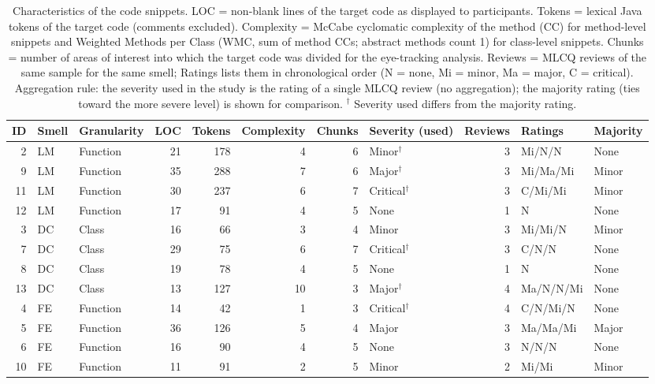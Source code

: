 \begin{table}[ht]
\centering
\caption{Characteristics of the code snippets. LOC = non-blank lines of the target code as displayed to
participants. Tokens = lexical Java tokens of the target code (comments excluded). Complexity = McCabe cyclomatic complexity of the method (CC) for method-level
snippets and Weighted Methods per Class (WMC, sum of method CCs; abstract methods count 1) for class-level
snippets. Chunks = number of areas of interest into which the target code was divided for the eye-tracking analysis.
Reviews = MLCQ reviews of the same sample for the same smell; Ratings lists them in chronological order
(N = none, Mi = minor, Ma = major, C = critical). Aggregation rule: the severity used in the study is the rating
of a single MLCQ review (no aggregation); the majority rating (ties toward the more severe level) is shown for
comparison. $^{\dagger}$ Severity used differs from the majority rating.}
\label{tab:snippet_characteristics}
\begin{tabular}{rllrrrrlrll}
\toprule
ID & Smell & Granularity & LOC & Tokens & Complexity & Chunks & Severity (used) & Reviews & Ratings & Majority \\
\midrule
2 & LM & Function & 21 & 178 & 4 & 6 & Minor$^{\dagger}$ & 3 & Mi/N/N & None \\
9 & LM & Function & 35 & 288 & 7 & 6 & Major$^{\dagger}$ & 3 & Mi/Ma/Mi & Minor \\
11 & LM & Function & 30 & 237 & 6 & 7 & Critical$^{\dagger}$ & 3 & C/Mi/Mi & Minor \\
12 & LM & Function & 17 & 91 & 4 & 5 & None & 1 & N & None \\
\midrule
3 & DC & Class & 16 & 66 & 3 & 4 & Minor & 3 & Mi/Mi/N & Minor \\
7 & DC & Class & 29 & 75 & 6 & 7 & Critical$^{\dagger}$ & 3 & C/N/N & None \\
8 & DC & Class & 19 & 78 & 4 & 5 & None & 1 & N & None \\
13 & DC & Class & 13 & 127 & 10 & 3 & Major$^{\dagger}$ & 4 & Ma/N/N/Mi & None \\
\midrule
4 & FE & Function & 14 & 42 & 1 & 3 & Critical$^{\dagger}$ & 4 & C/N/Mi/N & None \\
5 & FE & Function & 36 & 126 & 5 & 4 & Major & 3 & Ma/Ma/Mi & Major \\
6 & FE & Function & 16 & 90 & 4 & 5 & None & 3 & N/N/N & None \\
10 & FE & Function & 11 & 91 & 2 & 5 & Minor & 2 & Mi/Mi & Minor \\
\bottomrule
\end{tabular}
\end{table}
